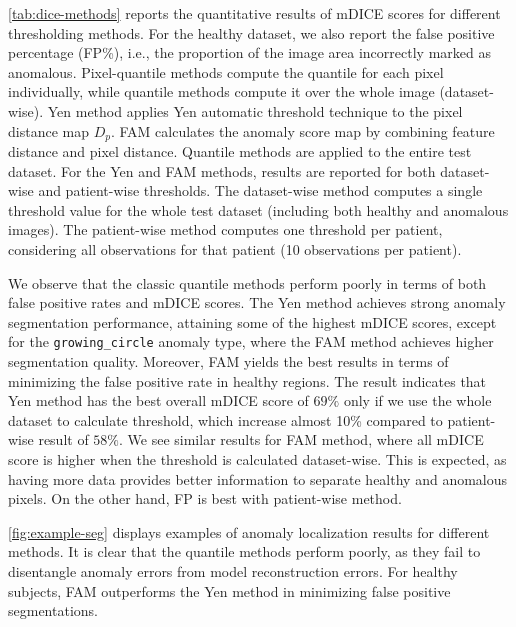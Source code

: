\cref{tab:dice-methods} reports the quantitative results of mDICE scores for different thresholding methods. For the healthy dataset, we also report the false positive percentage (FP\%), i.e., the proportion of the image area incorrectly marked as anomalous. Pixel-quantile methods compute the quantile for each pixel individually, while quantile methods compute it over the whole image (dataset-wise). Yen method applies Yen automatic threshold technique to the pixel distance map $D_p$. \ac{FAM} calculates the anomaly score map by combining feature distance and pixel distance. Quantile methods are applied to the entire test dataset. For the Yen and \ac{FAM} methods, results are reported for both dataset-wise and patient-wise thresholds. The dataset-wise method computes a single threshold value for the whole test dataset (including both healthy and anomalous images). The patient-wise method computes one threshold per patient, considering all observations for that patient (10 observations per patient).

We observe that the classic quantile methods perform poorly in terms of both false positive rates and mDICE scores. The Yen method achieves strong anomaly segmentation performance, attaining some of the highest mDICE scores, except for the \texttt{growing\_circle} anomaly type, where the \ac{FAM} method achieves higher segmentation quality. Moreover, \ac{FAM} yields the best results in terms of minimizing the false positive rate in healthy regions. The result indicates that Yen method has the best overall mDICE score of $69\%$ only if we use the whole dataset to calculate threshold, which increase almost 10\% compared to patient-wise result of $58\%$. We see similar results for \ac{FAM} method, where all mDICE score is higher when the threshold is calculated dataset-wise. This is expected, as having more data provides better information to separate healthy and anomalous pixels. On the other hand, FP is best with patient-wise method. 

\cref{fig:example-seg} displays examples of anomaly localization results for different methods. It is clear that the quantile methods perform poorly, as they fail to disentangle anomaly errors from model reconstruction errors. For healthy subjects, \ac{FAM} outperforms the Yen method in minimizing false positive segmentations.

